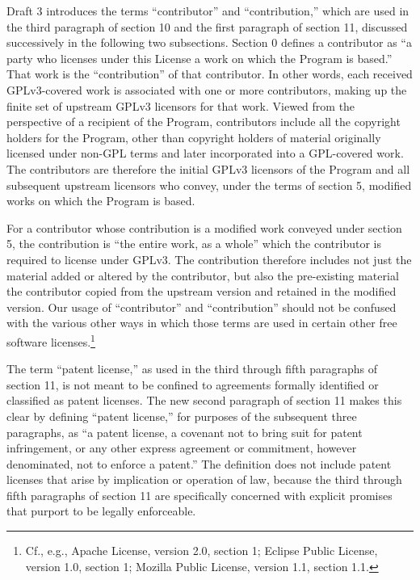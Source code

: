 Draft 3 introduces the terms ``contributor'' and ``contribution,'' which are
used in the third paragraph of section 10 and the first paragraph of section
11, discussed successively in the following two subsections.  Section 0
defines a contributor as ``a party who licenses under this License a work on
which the Program is based.'' That work is the ``contribution'' of that
contributor.  In other words, each received GPLv3-covered work is associated
with one or more contributors, making up the finite set of upstream GPLv3
licensors for that work. Viewed from the perspective of a recipient of the
Program, contributors include all the copyright holders for the Program,
other than copyright holders of material originally licensed under non-GPL
terms and later incorporated into a GPL-covered work.  The contributors are
therefore the initial GPLv3 licensors of the Program and all subsequent
upstream licensors who convey, under the terms of section 5, modified works
on which the Program is based.

For a contributor whose contribution is a modified work conveyed under
section 5, the contribution is ``the entire work, as a whole'' which the
contributor is required to license under GPLv3.  The contribution therefore
includes not just the material added or altered by the contributor, but also
the pre-existing material the contributor copied from the upstream version
and retained in the modified version. Our usage of ``contributor'' and
``contribution'' should not be confused with the various other ways in which
those terms are used in certain other free software licenses.\footnote{Cf.,
  e.g., Apache License, version 2.0, section 1; Eclipse Public License,
  version 1.0, section 1; Mozilla Public License, version 1.1, section 1.1.}

The term ``patent license,'' as used in the third through fifth
paragraphs of section 11, is not meant to be confined to agreements
formally identified or classified as patent licenses.  The new second
paragraph of section 11 makes this clear by defining ``patent license,''
for purposes of the subsequent three paragraphs, as ``a patent license,
a covenant not to bring suit for patent infringement, or any other
express agreement or commitment, however denominated, not to enforce a
patent.''  The definition does not include patent licenses that arise by
implication or operation of law, because the third through fifth
paragraphs of section 11 are specifically concerned with explicit
promises that purport to be legally enforceable.

